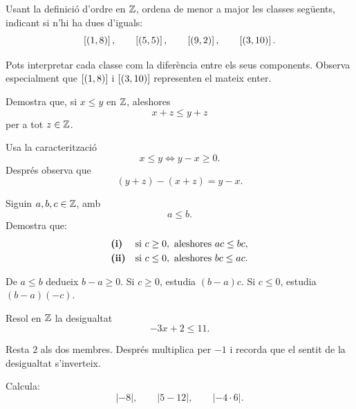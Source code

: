 \begin{exercici}[Ordre en \(\Z\)]
Usant la definició d'ordre en \(\Z\), ordena de menor a major les classes següents, indicant si n'hi ha dues d'iguals:
\[
\left[(1,8)\right],
\qquad
\left[(5,5)\right],
\qquad
\left[(9,2)\right],
\qquad
\left[(3,10)\right].
\]
\end{exercici}

\begin{indicacio}
Pots interpretar cada classe com la diferència entre els seus components. Observa especialment que \(\left[(1,8)\right]\) i \(\left[(3,10)\right]\) representen el mateix enter.
\end{indicacio}


\begin{exercici}
Demostra que, si \(x\leq y\) en \(\Z\), aleshores
\[
x+z\leq y+z
\]
per a tot \(z\in\mathbb{Z}\).
\end{exercici}

\begin{indicacio}
Usa la caracterització
\[
x\leq y\iff y-x\geq0.
\]
Després observa que
\[
(y+z)-(x+z)=y-x.
\]
\end{indicacio}


\begin{exercici}
Siguin \(a,b,c\in\mathbb{Z}\), amb
\[
a\leq b.
\]
Demostra que:
\[
\begin{array}{ll}
\text{\textbf{(i)}} & \text{si } c\geq0,\text{ aleshores } ac\leq bc,\\[1mm]
\text{\textbf{(ii)}} & \text{si } c\leq0,\text{ aleshores } bc\leq ac.
\end{array}
\]
\end{exercici}

\begin{indicacio}
De \(a\leq b\) dedueix \(b-a\geq0\). Si \(c\geq0\), estudia \((b-a)c\). Si \(c\leq0\), estudia \((b-a)(-c)\).
\end{indicacio}


\begin{exercici}
Resol en \(\Z\) la desigualtat
\[
-3x+2\leq 11.
\]
\end{exercici}

\begin{indicacio}
Resta \(2\) als dos membres. Després multiplica per \(-1\) i recorda que el sentit de la desigualtat s'inverteix.
\end{indicacio}


\begin{exercici}
Calcula:
\[
|-8|,
\qquad
|5-12|,
\qquad
|-4\cdot6|.
\]
\end{exercici}

